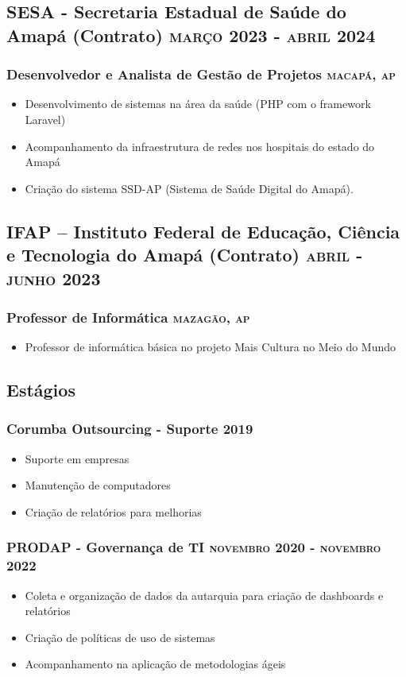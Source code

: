 \documentclass{article}
\newcommand{\rside}[1]{\hfill \normalfont\scshape\MakeLowercase{#1}}
\begin{document}
\subsection{SESA - Secretaria Estadual de Saúde do Amapá (Contrato) \rside{Março 2023 - Abril 2024}}
\subsubsection{ Desenvolvedor e Analista de Gestão de Projetos  \rside{Macapá, AP}}
\begin{itemize}
  \item Desenvolvimento de sistemas na área da saúde (PHP com o framework Laravel)
  \item Acompanhamento da infraestrutura de redes nos hospitais do estado do Amapá
  \item Criação do sistema SSD-AP (Sistema de Saúde Digital do Amapá).
\end{itemize}

\subsection{IFAP – Instituto Federal de Educação, Ciência e Tecnologia do Amapá (Contrato) \rside{Abril - Junho 2023}}
\subsubsection{ Professor de Informática  \rside{Mazagão, AP}}
\begin{itemize}
  \item Professor de informática básica no projeto Mais Cultura no Meio do Mundo
\end{itemize}

\subsection{Estágios}
\subsubsection{Corumba Outsourcing - Suporte \rside{2019}}
\begin{itemize}
  \item Suporte em empresas
  \item Manutenção de computadores
  \item Criação de relatórios para melhorias
\end{itemize}
\subsubsection{PRODAP - Governança de TI \rside{Novembro 2020 - Novembro 2022}}
\begin{itemize}
  \item Coleta e organização de dados da autarquia para criação de dashboards e relatórios
  \item Criação de políticas de uso de sistemas
  \item Acompanhamento na aplicação de metodologias ágeis
\end{itemize}
\end{document}
